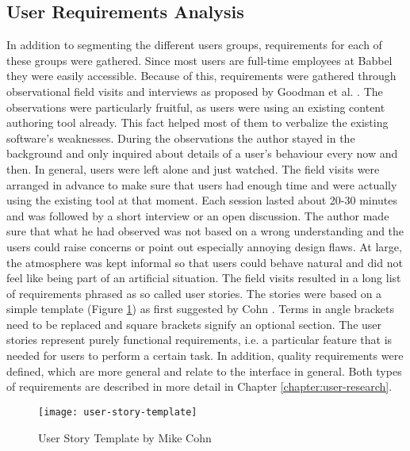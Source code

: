 \subsection{User Requirements Analysis}
In addition to segmenting the different users groups, requirements for each of these groups were gathered. Since most users are full-time employees at Babbel they were easily accessible. Because of this, requirements were gathered through observational field visits and interviews as proposed by Goodman et al. \cite{goodman_observing_2012}. The observations were particularly fruitful, as users were using an existing content authoring tool already. This fact helped most of them to verbalize the existing software's weaknesses. During the observations the author stayed in the background and only inquired about details of a user's behaviour every now and then. In general, users were left alone and just watched. The field visits were arranged in advance to make sure that users had enough time and were actually using the existing tool at that moment. Each session lasted about 20-30 minutes and was followed by a short interview or an open discussion. The author made sure that what he had observed was not based on a wrong understanding and the users could raise concerns or point out especially annoying design flaws. At large, the atmosphere was kept informal so that users could behave natural and did not feel like being part of an artificial situation. The field visits resulted in a long list of requirements phrased as so called user stories. The stories were based on a simple template (Figure \ref{fig:user-story-template}) as first suggested by Cohn \cite{_user_2004}. Terms in angle brackets need to be replaced and square brackets signify an optional section. The user stories represent purely functional requirements, i.e. a particular feature that is needed for users to perform a certain task. In addition, quality requirements were defined, which are more general and relate to the interface in general. Both types of requirements are described in more detail in Chapter \ref{chapter:user-research}.

\begin{figure}[h!]
\centering
\texttt{[image: user-story-template]}
\caption{User Story Template by Mike Cohn}
\label{fig:user-story-template}
\end{figure}



